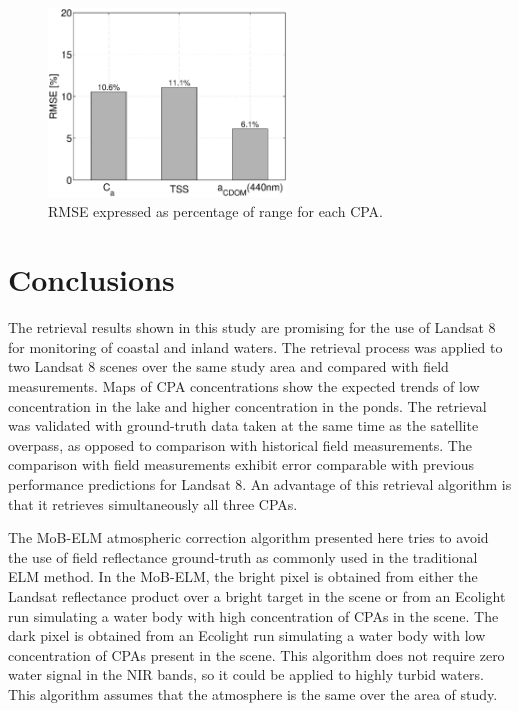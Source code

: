 \documentclass[onecolumn,3p,letterpaper]{elsarticle}
\begin{document}
\begin{figure}[htb]
	\centering
      \includegraphics[height=5cm]{./Images/RMSE_ret150421}
      \caption{RMSE expressed as percentage of range for each CPA. \label{fig:RMSE}}
\end{figure}

\section{Conclusions}
The retrieval results shown in this study are promising for the use of Landsat 8 for monitoring of coastal and inland waters. The retrieval process was applied to two Landsat 8 scenes over the same study area and compared with field measurements. Maps of CPA concentrations show the expected trends of low concentration in the lake and higher concentration in the ponds. The retrieval was validated with ground-truth data taken at the same time as the satellite overpass, as opposed to comparison with historical field measurements. The comparison with field measurements exhibit error comparable with previous performance predictions for Landsat 8. An advantage of this retrieval algorithm is that it retrieves simultaneously all three CPAs.

The MoB-ELM atmospheric correction algorithm presented here tries to avoid the use of field reflectance ground-truth as commonly used in the traditional ELM method. In the MoB-ELM, the bright pixel is obtained from either the Landsat reflectance product over a bright target in the scene or from an Ecolight run simulating a water body with high concentration of CPAs in the scene. The dark pixel is obtained from an Ecolight run simulating a water body with low concentration of CPAs present in the scene. This algorithm does not require zero water signal in the NIR bands, so it could be applied to highly turbid waters. This algorithm assumes that the atmosphere is the same over the area of study.
\end{document}
